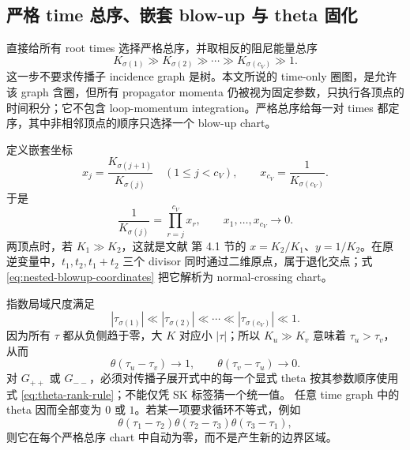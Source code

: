 \documentclass[11pt,a4paper]{ctexart}
\begin{document}
\subsection{严格 time 总序、嵌套 blow-up 与 theta 固化}

直接给所有 root times 选择严格总序，并取相反的阻尼能量总序
\begin{equation}
 K_{\sigma(1)}\gg K_{\sigma(2)}\gg\cdots
 \gg K_{\sigma(c_V)}\gg1.
 \label{eq:strict-energy-rank}
\end{equation}
这一步不要求传播子 incidence graph 是树。本文所说的 time-only 圈图，是允许该 graph 含圈，但所有 propagator momenta 仍被视为固定参数，只执行各顶点的时间积分；它不包含 loop-momentum integration。严格总序给每一对 times 都定序，其中非相邻顶点的顺序只选择一个 blow-up chart。

定义嵌套坐标
\begin{equation}
 x_j=\frac{K_{\sigma(j+1)}}{K_{\sigma(j)}}
 \quad(1\leq j<c_V),
 \qquad
 x_{c_V}=\frac{1}{K_{\sigma(c_V)}}.
 \label{eq:nested-blowup-coordinates}
\end{equation}
于是
\begin{equation}
 \frac{1}{K_{\sigma(j)}}=\prod_{r=j}^{c_V}x_r,
 \qquad x_1,\ldots,x_{c_V}\longrightarrow0.
 \label{eq:nested-energy-inverse}
\end{equation}
两顶点时，若 $K_1\gg K_2$，这就是文献 \cite{Chen:2024jms} 第 4.1 节的 $x=K_2/K_1$、$y=1/K_2$。在原逆变量中，$t_1,t_2,t_1+t_2$ 三个 divisor 同时通过二维原点，属于退化交点；式 \eqref{eq:nested-blowup-coordinates} 把它解析为 normal-crossing chart。

指数局域尺度满足
\begin{equation}
 |\tau_{\sigma(1)}|\ll|\tau_{\sigma(2)}|\ll\cdots
 \ll|\tau_{\sigma(c_V)}|\ll1.
 \label{eq:tau-rank}
\end{equation}
因为所有 $\tau$ 都从负侧趋于零，大 $K$ 对应小 $|\tau|$；所以 $K_u\gg K_v$ 意味着 $\tau_u>\tau_v$，从而
\begin{equation}
 \theta(\tau_u-\tau_v)\longrightarrow1,
 \qquad
 \theta(\tau_v-\tau_u)\longrightarrow0.
 \label{eq:theta-rank-rule}
\end{equation}
对 $G_{++}$ 或 $G_{--}$，必须对传播子展开式中的每一个显式 theta 按其参数顺序使用式 \eqref{eq:theta-rank-rule}；不能仅凭 SK 标签猜一个统一值。
任意 time graph 中的 theta 因而全部变为 $0$ 或 $1$。若某一项要求循环不等式，例如
\begin{equation}
 \theta(\tau_1-\tau_2)\theta(\tau_2-\tau_3)
 \theta(\tau_3-\tau_1),
\end{equation}
则它在每个严格总序 chart 中自动为零，而不是产生新的边界区域。
\end{document}
